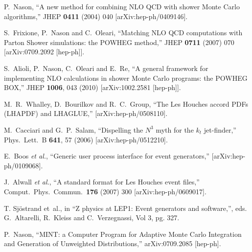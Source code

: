 \documentclass[paper]{JHEP3}
\begin{document}
\begin{thebibliography}{10}

  P.~Nason,
  ``A new method for combining NLO QCD with shower Monte Carlo algorithms,''
  JHEP {\bf 0411} (2004) 040
  [arXiv:hep-ph/0409146].

  S.~Frixione, P.~Nason and C.~Oleari,
``Matching NLO QCD computations with Parton Shower simulations: the POWHEG
method,''
  JHEP {\bf 0711} (2007) 070
  [arXiv:0709.2092 [hep-ph]].

  S.~Alioli, P.~Nason, C.~Oleari and E.~Re,
``A general framework for implementing NLO calculations in shower Monte Carlo
programs: the POWHEG BOX,''
  JHEP {\bf 1006}, 043 (2010)
  [arXiv:1002.2581 [hep-ph]].

  M.~R.~Whalley, D.~Bourilkov and R.~C.~Group,
  ``The Les Houches accord PDFs (LHAPDF) and LHAGLUE,''
  [arXiv:hep-ph/0508110].

  M.~Cacciari and G.~P.~Salam,
  ``Dispelling the $N^{3}$ myth for the $k_t$ jet-finder,''
  Phys.\ Lett.\  B {\bf 641}, 57 (2006)
  [arXiv:hep-ph/0512210].

  E.~Boos {\it et al.},
  ``Generic user process interface for event generators,''
  [arXiv:hep-ph/0109068].

  J.~Alwall {\it et al.},
  ``A standard format for Les Houches event files,''
  Comput.\ Phys.\ Commun.\  {\bf 176} (2007) 300
  [arXiv:hep-ph/0609017].

 T. Sj\"ostrand et~al., in
  ``Z physics at LEP1: Event generators and software,'',  eds.
  G.~Altarelli, R.~Kleiss and C.~Verzegnassi, Vol 3, pg. 327.

  P.~Nason,
  ``MINT: a Computer Program for Adaptive Monte Carlo Integration and
  Generation of Unweighted Distributions,''
  arXiv:0709.2085 [hep-ph].




\end{thebibliography}
\end{document}
